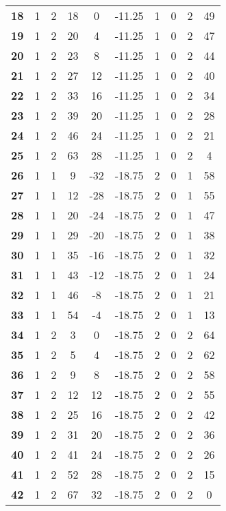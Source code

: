 \documentclass{article}%
\begin{document}
\begin{longtable}{cccccccccc}
        \textbf{18} & 1 & 2 & 18 & 0 & -11.25 & 1 & 0 & 2 & 49 \\ 
        \textbf{19} & 1 & 2 & 20 & 4 & -11.25 & 1 & 0 & 2 & 47 \\ 
        \textbf{20} & 1 & 2 & 23 & 8 & -11.25 & 1 & 0 & 2 & 44 \\ 
        \textbf{21} & 1 & 2 & 27 & 12 & -11.25 & 1 & 0 & 2 & 40 \\ 
        \textbf{22} & 1 & 2 & 33 & 16 & -11.25 & 1 & 0 & 2 & 34 \\ 
        \textbf{23} & 1 & 2 & 39 & 20 & -11.25 & 1 & 0 & 2 & 28 \\ 
        \textbf{24} & 1 & 2 & 46 & 24 & -11.25 & 1 & 0 & 2 & 21 \\ 
        \textbf{25} & 1 & 2 & 63 & 28 & -11.25 & 1 & 0 & 2 & 4 \\ 
        \textbf{26} & 1 & 1 & 9 & -32 & -18.75 & 2 & 0 & 1 & 58 \\ 
        \textbf{27} & 1 & 1 & 12 & -28 & -18.75 & 2 & 0 & 1 & 55 \\ 
        \textbf{28} & 1 & 1 & 20 & -24 & -18.75 & 2 & 0 & 1 & 47 \\ 
        \textbf{29} & 1 & 1 & 29 & -20 & -18.75 & 2 & 0 & 1 & 38 \\ 
        \textbf{30} & 1 & 1 & 35 & -16 & -18.75 & 2 & 0 & 1 & 32 \\ 
        \textbf{31} & 1 & 1 & 43 & -12 & -18.75 & 2 & 0 & 1 & 24 \\ 
        \textbf{32} & 1 & 1 & 46 & -8 & -18.75 & 2 & 0 & 1 & 21 \\ 
        \textbf{33} & 1 & 1 & 54 & -4 & -18.75 & 2 & 0 & 1 & 13 \\ 
        \textbf{34} & 1 & 2 & 3 & 0 & -18.75 & 2 & 0 & 2 & 64 \\ 
        \textbf{35} & 1 & 2 & 5 & 4 & -18.75 & 2 & 0 & 2 & 62 \\ 
        \textbf{36} & 1 & 2 & 9 & 8 & -18.75 & 2 & 0 & 2 & 58 \\ 
        \textbf{37} & 1 & 2 & 12 & 12 & -18.75 & 2 & 0 & 2 & 55 \\ 
        \textbf{38} & 1 & 2 & 25 & 16 & -18.75 & 2 & 0 & 2 & 42 \\ 
        \textbf{39} & 1 & 2 & 31 & 20 & -18.75 & 2 & 0 & 2 & 36 \\ 
        \textbf{40} & 1 & 2 & 41 & 24 & -18.75 & 2 & 0 & 2 & 26 \\ 
        \textbf{41} & 1 & 2 & 52 & 28 & -18.75 & 2 & 0 & 2 & 15 \\ 
        \textbf{42} & 1 & 2 & 67 & 32 & -18.75 & 2 & 0 & 2 & 0 \\ 

\end{longtable}
\end{document}
